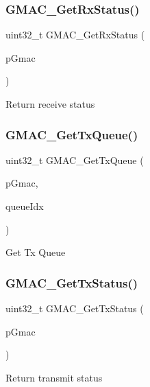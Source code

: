 \subsubsection{\texorpdfstring{GMAC\_GetRxStatus()}{GMAC\_GetRxStatus()}}
{\footnotesize\ttfamily uint32\+\_\+t G\+M\+A\+C\+\_\+\+Get\+Rx\+Status (\begin{DoxyParamCaption}\item[{\mbox{\hyperlink{structGmac}{Gmac}} $\ast$}]{p\+Gmac }\end{DoxyParamCaption})}

Return receive status \mbox{\label{group__gmac__defines_ga639d2d7bdfcd93c39d183b84a5b02a34}} 
\subsubsection{\texorpdfstring{GMAC\_GetTxQueue()}{GMAC\_GetTxQueue()}}
{\footnotesize\ttfamily uint32\+\_\+t G\+M\+A\+C\+\_\+\+Get\+Tx\+Queue (\begin{DoxyParamCaption}\item[{\mbox{\hyperlink{structGmac}{Gmac}} $\ast$}]{p\+Gmac,  }\item[{gmac\+Que\+List\+\_\+t}]{queue\+Idx }\end{DoxyParamCaption})}

Get Tx Queue \mbox{\label{group__gmac__defines_gafba1535fac70522c3101326e020ca1d6}} 
\subsubsection{\texorpdfstring{GMAC\_GetTxStatus()}{GMAC\_GetTxStatus()}}
{\footnotesize\ttfamily uint32\+\_\+t G\+M\+A\+C\+\_\+\+Get\+Tx\+Status (\begin{DoxyParamCaption}\item[{\mbox{\hyperlink{structGmac}{Gmac}} $\ast$}]{p\+Gmac }\end{DoxyParamCaption})}

Return transmit status \mbox{\label{group__gmac__defines_gac179a7fa9d7e3dcabf9a88f996ec0a80}} 
